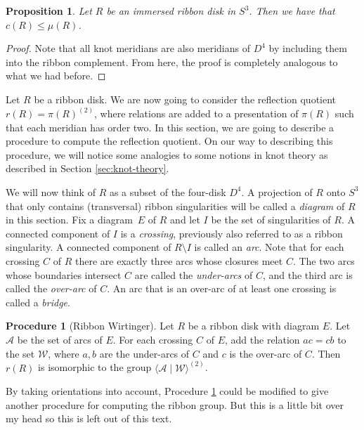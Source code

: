 \documentclass{article}
\newtheorem{proposition}[theorem]{Proposition}
\theoremstyle{definition}
\newtheorem{algo}[theorem]{Procedure}
\begin{document}
\begin{proposition}
Let $R$ be an immersed ribbon disk in $S^3$. Then we have that $c(R) \leq \mu(R)$.
\end{proposition}

\begin{proof}
Note that all knot meridians are also meridians of $D^4$ by including them into the ribbon complement. From here, the proof is completely analogous to what we had before.
\end{proof}

Let $R$ be a ribbon disk. We are now going to consider the reflection quotient $r(R) = \pi(R)^{(2)}$, where relations are added to a presentation of $\pi(R)$ such that each meridian has order two. In this section, we are going to describe a procedure to compute the reflection quotient. On our way to describing this procedure, we will notice some analogies to some notions in knot theory as described in Section \ref{sec:knot-theory}.

We will now think of $R$ as a subset of the four-disk $D^4$. A projection of $R$ onto $S^3$ that only contains (transversal) ribbon singularities will be called a \textit{diagram} of $R$ in this section. Fix a diagram~$E$ of $R$ and let $I$ be the set of singularities of $R$. A connected component of $I$ is a \textit{crossing}, previously also referred to as a ribbon singularity. A connected component of $R \setminus I$ is called an \textit{arc}. Note that for each crossing $C$ of $R$ there are exactly three arcs whose closures meet $C$. The two arcs whose boundaries intersect $C$ are called the \textit{under-arcs} of $C$, and the third arc is called the \textit{over-arc} of $C$. An arc that is an over-arc of at least one crossing is called a \textit{bridge}.

\begin{algo}[Ribbon Wirtinger]\label{alg:ribbon-wirtinger}
Let $R$ be a ribbon disk with diagram $E$. Let $\mathcal{A}$ be the set of arcs of $E$. For each crossing $C$ of $E$, add the relation $ac = cb$ to the set $\mathcal{W}$, where $a, b$ are the under-arcs of $C$ and $c$ is the over-arc of $C$. Then $r(R)$ is isomorphic to the group $\langle \mathcal{A} \; | \; \mathcal{W} \rangle^{(2)}$.
\end{algo}

By taking orientations into account, Procedure \ref{alg:ribbon-wirtinger} could be modified to give another procedure for computing the ribbon group. But this is a little bit over my head so this is left out of this text.
\end{document}
